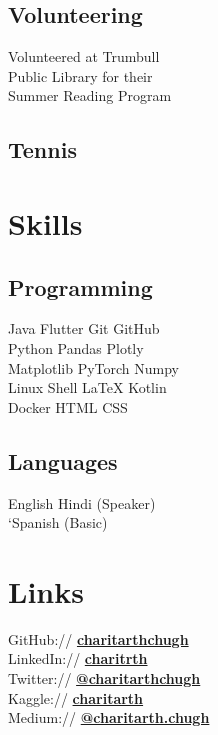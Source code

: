 \documentclass[]{resume-template}
\begin{document}
\begin{minipage}[t]{0.33\textwidth}
\subsection{Volunteering}\label{subsec:volunteering}
Volunteered at Trumbull \\
Public Library for their\\
Summer Reading Program
\sectionsep{}


\subsection{Tennis}

\section{Skills}\label{sec:skills}

\subsection{Programming}\label{subsec:programming}
Java \textbullet{} Flutter \textbullet{} Git \textbullet{} GitHub\\
Python \textbullet{} Pandas \textbullet{} Plotly\\
Matplotlib \textbullet{} PyTorch \textbullet Numpy\\
Linux \textbullet{} Shell \textbullet{}  \LaTeX{} \textbullet{} Kotlin\\
Docker \textbullet{}  HTML \textbullet{}  CSS
\sectionsep{}

\subsection{Languages}
English \textbullet{} Hindi (Speaker)\\
`Spanish (Basic)

\section{Links}\label{sec:links}
GitHub:// \href{https://github.com/charitarthchugh}{\textbf {charitarthchugh}} \\
LinkedIn:// \href{https:///www.linkedin.com/in/charitarth}{\textbf {charitrth}} \\
Twitter:// \href{https://twitter.com/charitarthchugh}{\textbf{@charitarthchugh}}\\
Kaggle:// \href{https://kaggle.com/charitarth}{\textbf{charitarth}}\\
Medium:// \href{https://medium.com/@charitarth.chugh}{\textbf{@charitarth.chugh}}\\
%
%

\end{minipage} 
\end{document}
